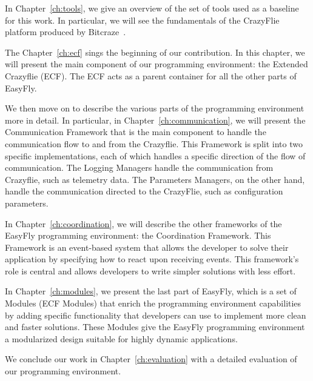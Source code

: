 In Chapter~\ref{ch:tools}, we give an overview of the set of tools used as a baseline for this work. 
In particular, we will see the fundamentals of the CrazyFlie platform produced by Bitcraze~\cite{bitcraze}.

The Chapter~\ref{ch:ecf} sings the beginning of our contribution. 
In this chapter, we will present the main component of our programming environment: the Extended Crazyflie (ECF).
The ECF acts as a parent container for all the other parts of EasyFly.

We then move on to describe the various parts of the programming environment more in detail. 
In particular, in Chapter~\ref{ch:communication}, we will present the Communication Framework that is the main component to handle the communication flow to and from the Crazyflie.
This Framework is split into two specific implementations, each of which handles a specific direction of the flow of communication. 
The Logging Managers handle the communication from Crazyflie, such as telemetry data.
The Parameters Managers, on the other hand, handle the communication directed to the CrazyFlie, such as configuration parameters.

In Chapter~\ref{ch:coordination}, we will describe the other frameworks of the EasyFly programming environment: the Coordination Framework.
This Framework is an event-based system that allows the developer to solve their application by specifying how to react upon receiving events.
This framework's role is central and allows developers to write simpler solutions with less effort.

In Chapter~\ref{ch:modules}, we present the last part of EasyFly, which is a set of Modules (ECF Modules) that enrich the programming environment capabilities by adding specific functionality that developers can use to implement more clean and faster solutions.
These Modules give the EasyFly programming environment a modularized design suitable for highly dynamic applications. 

We conclude our work in Chapter~\ref{ch:evaluation} with a detailed evaluation of our programming environment.